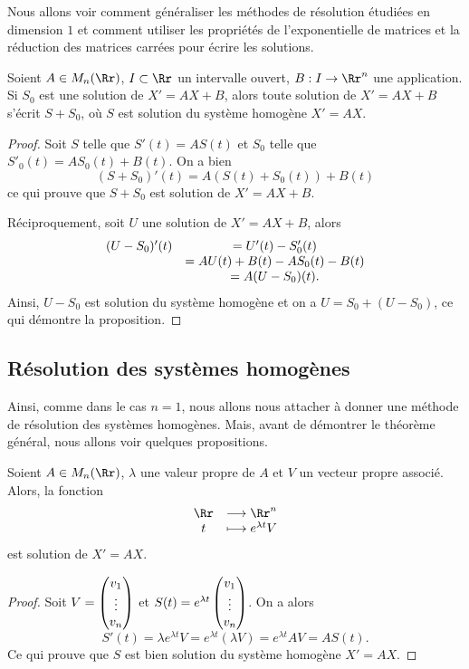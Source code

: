 \documentclass[class=report,crop=false]{standalone}
\begin{document}
Nous allons voir comment généraliser les méthodes de résolution 
étudiées en dimension $1$ et comment utiliser les propriétés 
de l'exponentielle de matrices et la réduction des matrices 
carrées pour écrire les solutions.


\begin{proposition}
Soient $A\in M_n(\Rr)$, $I\subset\Rr$ un intervalle ouvert, $B: I\rightarrow\Rr^n$ une application.
Si $S_0$ est une solution de $X'=AX+B$, alors toute solution de $X'=AX+B$ s'écrit $S+S_0$, où $S$ est solution du 
système homogène $X'=AX$.
\end{proposition}   

\begin{proof}
Soit $S$ telle que $S'(t)=AS(t)$ et $S_0$ telle que $S'_0(t)=AS_0(t)+B(t)$. On a bien $$(S+S_0)'(t)=A(S(t)+S_0(t))+B(t)$$
ce qui prouve que $S+S_0$ est solution de $X'=AX+B$.

Réciproquement, soit $U$ une solution de $X'=AX+B$, alors 
$$\begin{array}{cc}(U-S_0)'(t)&= U'(t)-S'_0(t)\cr &=AU(t)+B(t)-AS_0(t)-B(t)\cr&=A(U-S_0)(t).\end{array}$$
Ainsi, $U-S_0$ est solution du système homogène et on a $U=S_0+(U-S_0)$, ce qui démontre la proposition.
\end{proof} 


\subsection{Résolution des systèmes homogènes}

Ainsi, comme dans le cas $n=1$, nous allons nous attacher à donner 
une méthode de résolution des systèmes homogènes. Mais, avant de 
démontrer le théorème général, nous allons voir quelques propositions.


\begin{proposition}
Soient $A\in M_n(\Rr)$, $\lambda$ une valeur propre de $A$ et $ V$ un vecteur propre associé. 
Alors, la fonction 
$$\begin{array}{cc}\Rr &\longrightarrow \Rr^n\cr t&\longmapsto e^{\lambda t} V\end{array}$$
est solution de $X'=AX$.
\end{proposition} 

\begin{proof}
Soit $V=\left(\begin{matrix}v_1\cr\vdots\cr v_n\end{matrix}\right)$ 
et $S(t)=e^{\lambda t}\left(\begin{matrix}v_1\cr\vdots\cr v_n\end{matrix}\right)$. 
On a alors
$$S'(t)=\lambda e^{\lambda t} V=e^{\lambda t}(\lambda V)=e^{\lambda t} AV=AS(t).$$
Ce qui prouve que $S$ est bien solution du système homogène $X'=AX$.
\end{proof}
\end{document}
